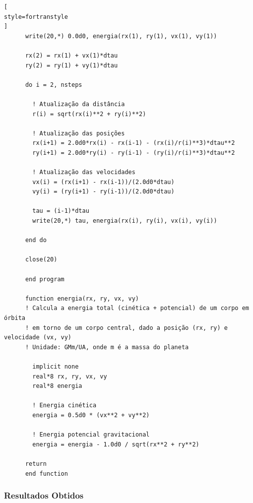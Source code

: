 \documentclass[12pt,a4paper]{article}
\begin{document}
\begin{lstlisting}[
style=fortranstyle
]
      write(20,*) 0.0d0, energia(rx(1), ry(1), vx(1), vy(1))

      rx(2) = rx(1) + vx(1)*dtau
      ry(2) = ry(1) + vy(1)*dtau

      do i = 2, nsteps

        ! Atualização da distância
        r(i) = sqrt(rx(i)**2 + ry(i)**2)

        ! Atualização das posições
        rx(i+1) = 2.0d0*rx(i) - rx(i-1) - (rx(i)/r(i)**3)*dtau**2
        ry(i+1) = 2.0d0*ry(i) - ry(i-1) - (ry(i)/r(i)**3)*dtau**2

        ! Atualização das velocidades
        vx(i) = (rx(i+1) - rx(i-1))/(2.0d0*dtau)
        vy(i) = (ry(i+1) - ry(i-1))/(2.0d0*dtau)

        tau = (i-1)*dtau
        write(20,*) tau, energia(rx(i), ry(i), vx(i), vy(i))

      end do

      close(20)

      end program

      function energia(rx, ry, vx, vy)
      ! Calcula a energia total (cinética + potencial) de um corpo em órbita
      ! em torno de um corpo central, dado a posição (rx, ry) e velocidade (vx, vy)
      ! Unidade: GMm/UA, onde m é a massa do planeta
      
        implicit none
        real*8 rx, ry, vx, vy
        real*8 energia

        ! Energia cinética
        energia = 0.5d0 * (vx**2 + vy**2)

        ! Energia potencial gravitacional
        energia = energia - 1.0d0 / sqrt(rx**2 + ry**2)

      return
      end function
\end{lstlisting}


\subsubsection{Resultados Obtidos}
\end{document}
